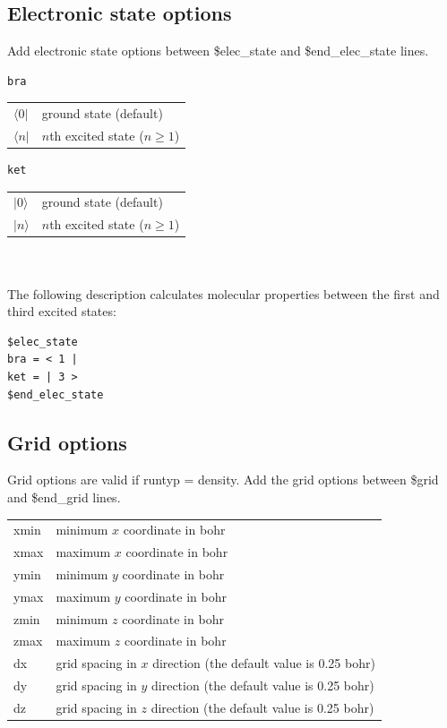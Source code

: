 ﻿\documentclass[11pt,a4paper,openany]{article}
\begin{document}
\subsection{Electronic state options}
\noindent
Add electronic state options between \$elec\_state and \$end\_elec\_state lines.
\begin{verbatim}
bra
\end{verbatim}
\begin{tabular}{ll}
$\langle 0 |$ & ground state (default)\\
$\langle n |$ & $n$th excited state ($n \geq 1$)
\end{tabular}
\begin{verbatim}
ket
\end{verbatim}
\begin{tabular}{ll}
$| 0 \rangle$ & ground state (default)\\
$| n \rangle$ & $n$th excited state ($n \geq 1$)
\end{tabular}
\\
\vspace{5mm} 
\\
The following description calculates molecular properties between the first and third excited states:
\begin{verbatim}
$elec_state
bra = < 1 |
ket = | 3 >
$end_elec_state
\end{verbatim}

\subsection{Grid options}
\noindent
Grid options are valid if runtyp = density.
Add the grid options between \$grid and \$end\_grid lines.\\

\begin{tabular}{ll}
xmin & minimum $x$ coordinate in bohr\\
xmax & maximum $x$ coordinate in bohr\\
ymin & minimum $y$ coordinate in bohr\\
ymax & maximum $y$ coordinate in bohr\\
zmin & minimum $z$ coordinate in bohr\\
zmax & maximum $z$ coordinate in bohr\\
dx & grid spacing in $x$ direction (the default value is 0.25 bohr)\\
dy & grid spacing in $y$ direction (the default value is 0.25 bohr)\\
dz & grid spacing in $z$ direction (the default value is 0.25 bohr)
\end{tabular}
\\
\end{document}
